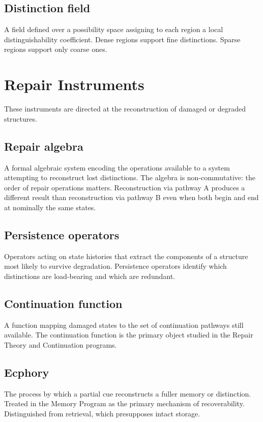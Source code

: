 \documentclass[12pt, openany]{book}
\begin{document}
\subsection{Distinction field} A field defined over a possibility space
assigning to each region a local distinguishability coefficient. Dense
regions support fine distinctions. Sparse regions support only coarse ones.

\section{Repair Instruments}

These instruments are directed at the reconstruction of damaged or degraded
structures.

\subsection{Repair algebra} A formal algebraic system encoding the operations
available to a system attempting to reconstruct lost distinctions. The
algebra is non-commutative: the order of repair operations matters.
Reconstruction via pathway A produces a different result than reconstruction
via pathway B even when both begin and end at nominally the same states.

\subsection{Persistence operators} Operators acting on state histories that
extract the components of a structure most likely to survive degradation.
Persistence operators identify which distinctions are load-bearing and which
are redundant.

\subsection{Continuation function} A function mapping damaged states to the
set of continuation pathways still available. The continuation function is
the primary object studied in the Repair Theory and Continuation programs.

\subsection{Ecphory} The process by which a partial cue reconstructs a
fuller memory or distinction. Treated in the Memory Program as the primary
mechanism of recoverability. Distinguished from retrieval, which presupposes
intact storage.
\end{document}
